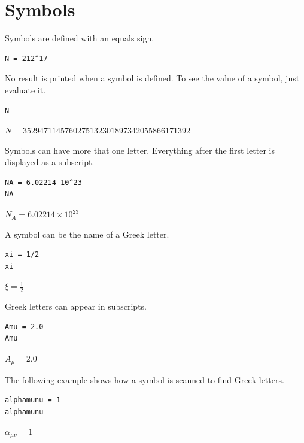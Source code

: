 
\newpage

\section{Symbols}

Symbols are defined with an equals sign.

{\color{blue}
\begin{verbatim}
N = 212^17
\end{verbatim}
}

No result is printed when a symbol is defined.
To see the value of a symbol, just evaluate it.

{\color{blue}
\begin{verbatim}
N
\end{verbatim}
}

$\displaystyle N=3529471145760275132301897342055866171392$

\bigskip

Symbols can have more that one letter.
Everything after the first letter is displayed as a subscript.

{\color{blue}
\begin{verbatim}
NA = 6.02214 10^23
NA
\end{verbatim}
}

$\displaystyle N_A=6.02214\times10^{23}$

\bigskip

A symbol can be the name of a Greek letter.

{\color{blue}
\begin{verbatim}
xi = 1/2
xi
\end{verbatim}
}

$\displaystyle \xi=\tfrac{1}{2}$

\bigskip

Greek letters can appear in subscripts.

{\color{blue}
\begin{verbatim}
Amu = 2.0
Amu
\end{verbatim}
}

$\displaystyle A_\mu=2.0$

\bigskip

The following example shows how a symbol is scanned to find Greek letters.

{\color{blue}
\begin{verbatim}
alphamunu = 1
alphamunu
\end{verbatim}
}

$\displaystyle \alpha_{\mu\nu}=1$

